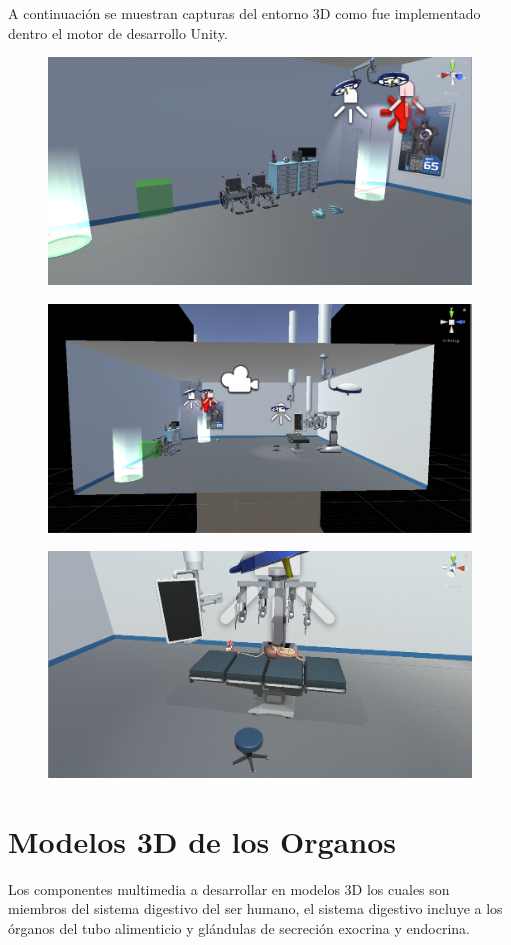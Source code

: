A continuación se muestran capturas del entorno 3D como fue implementado dentro el motor de desarrollo Unity.\\

\begin{figure}[H]
	\begin{center}
 		\includegraphics[width = .5\textwidth]{source/images/image63.png}
	\end{center} 
\end{figure}

\begin{figure}[H]
	\begin{center}
 		\includegraphics[width = .5\textwidth]{source/images/image53.png}
	\end{center} 
\end{figure}

\begin{figure}[H]
	\begin{center}
 		\includegraphics[width = .5\textwidth]{source/images/image16.png}
	\end{center} 
\end{figure}

\section{Modelos 3D de los Organos}
Los componentes multimedia a desarrollar en modelos 3D los cuales son miembros del sistema digestivo del ser humano, 
el sistema digestivo incluye a los órganos del tubo alimenticio y glándulas de secreción exocrina y endocrina.\\

